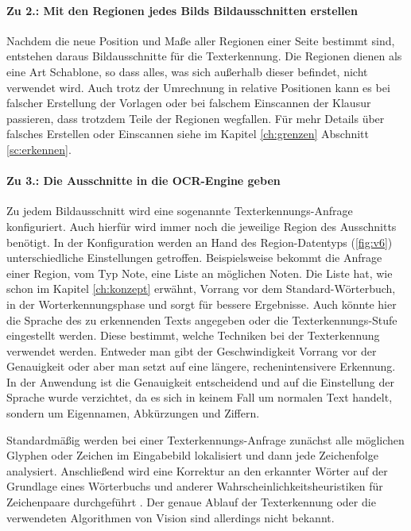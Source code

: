 \documentclass[nomenclature, oneside, 150]{HSMW-Thesis}
\begin{document}
				\paragraph{Zu 2.: Mit den Regionen jedes Bilds Bildausschnitten erstellen}
				Nachdem die neue Position und Maße aller Regionen einer Seite bestimmt sind, entstehen daraus Bildausschnitte für die Texterkennung. Die Regionen dienen als eine Art Schablone, so dass alles, was sich außerhalb dieser befindet, nicht verwendet wird. Auch trotz der Umrechnung in relative Positionen kann es bei falscher Erstellung der Vorlagen oder bei falschem Einscannen der Klausur passieren, dass trotzdem Teile der Regionen wegfallen. Für mehr Details über falsches Erstellen oder Einscannen siehe im Kapitel \ref{ch:grenzen} Abschnitt \ref{sc:erkennen}.
				
				\paragraph{Zu 3.: Die Ausschnitte in die OCR-Engine geben}
				Zu jedem Bildausschnitt wird eine sogenannte Texterkennungs-Anfrage konfiguriert. Auch hierfür wird immer noch die jeweilige Region des Ausschnitts benötigt. In der Konfiguration werden an Hand des Region-Datentyps (\ref{fig:v6}) unterschiedliche Einstellungen getroffen. Beispielsweise bekommt die Anfrage einer Region, vom Typ Note, eine Liste an möglichen Noten. Die Liste hat, wie schon im Kapitel \ref{ch:konzept} erwähnt, Vorrang vor dem Standard-Wörterbuch, in der Worterkennungsphase und sorgt für bessere Ergebnisse. Auch könnte hier die Sprache des zu erkennenden Texts angegeben oder die  Texterkennungs-Stufe eingestellt werden. Diese bestimmt, welche Techniken bei der Texterkennung verwendet werden. Entweder man gibt der Geschwindigkeit Vorrang vor der Genauigkeit oder aber man setzt auf eine längere, rechenintensivere Erkennung. In der Anwendung ist die Genauigkeit entscheidend und auf die Einstellung der Sprache wurde verzichtet, da es sich in keinem Fall um normalen Text handelt, sondern um Eigennamen, Abkürzungen und Ziffern.
						
				Standardmäßig werden bei einer Texterkennungs-Anfrage zunächst alle möglichen Glyphen oder Zeichen im Eingabebild lokalisiert und dann jede Zeichenfolge analysiert. Anschließend wird eine Korrektur an den erkannter Wörter auf der Grundlage eines Wörterbuchs und anderer Wahrscheinlichkeitsheuristiken für Zeichenpaare durchgeführt \cite{noauthor_text_2019}. Der genaue Ablauf der Texterkennung oder die verwendeten Algorithmen von Vision sind allerdings nicht bekannt. 
				
\end{document}
